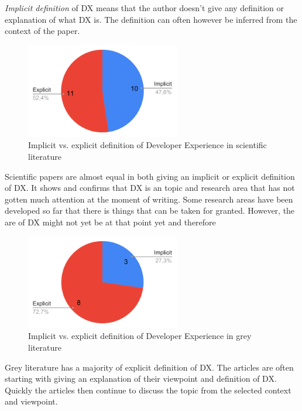 \documentclass[english, 12pt, a4paper, sci, utf8, a-1b, online]{aaltothesis}
\begin{document}
\textit{Implicit definition} of DX means that the author doesn't give any definition or explanation of what DX is. The definition can often however be inferred from the context of the paper.

\begin{figure}[ht]
  \captionsetup{width=0.6\textwidth}
  \caption{Implicit vs. explicit definition of Developer Experience in scientific literature}
  \begin{center}
    \includegraphics[width=0.6\textwidth]{definition-scientific.pdf}
  \end{center}
\end{figure}

Scientific papers are almost equal in both giving an implicit or explicit definition of DX. It shows and confirms that DX is an topic and research area that has not gotten much attention at the moment of writing. Some research areas have been developed so far that there is things that can be taken for granted. However, the are of DX might not yet be at that point yet and therefore

\begin{figure}[ht]
  \captionsetup{width=0.6\textwidth}
  \begin{center}
    \caption{Implicit vs. explicit definition of Developer Experience in grey literature}
    \includegraphics[width=0.6\textwidth]{definition-grey.pdf}
  \end{center}
\end{figure}

Grey literature has a majority of explicit definition of DX. The articles are often starting with giving an explanation of their viewpoint and definition of DX. Quickly the articles then continue to discuss the topic from the selected context and viewpoint.
\end{document}
